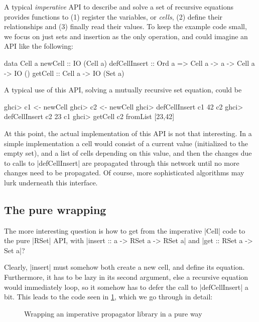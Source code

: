 \documentclass[manuscript,anonymous,screen,acmsmall]{acmart}
\begin{document}
A typical \emph{imperative} API to describe and solve a set of recursive equations provides functions to (1) register the variables, or \emph{cells}, (2) define their relationships and (3) finally read their values. To keep the example code small, we focus on just sets and insertion as the only operation, and could imagine an API like the following:
\begin{code}
data Cell a
newCell       ::  IO (Cell a)
defCellInsert  ::  Ord a => Cell a -> a -> Cell a -> IO ()
getCell       ::  Cell a -> IO (Set a)
\end{code}

A typical use of this API, solving a mutually recursive set equation, could be
\begin{code}
ghci> c1 <- newCell
ghci> c2 <- newCell
ghci> defCellInsert c1 42 c2
ghci> defCellInsert c2 23 c1
ghci> getCell c2
fromList [23,42]
\end{code}

At this point, the actual implementation of this API is not that interesting. In a simple implementation a cell would consist of a current value (initialized to the empty set), and a list of cells depending on this value, and then the changes due to calls to |defCellInsert| are propagated through this network until no more changes need to be propagated. Of course, more sophisticated algorithms may lurk underneath this interface.

\subsection{The pure wrapping}

The more interesting question is how to get from the imperative |Cell| code to the pure |RSet| API, with |insert :: a -> RSet a -> RSet a| and |get :: RSet a -> Set a|?

Clearly, |insert| must somehow both create a new cell, and define its equation.
Furthermore, it has to be lazy in its second argument, else a recursive equation would immediately loop, so it somehow has to defer the call to |defCellInsert| a bit. This leads to the code seen in \cref{fig:wrap}, which we go through in detail:

\begin{figure}%
\setlength{\abovedisplayskip}{0pt}%
\setlength{\belowdisplayskip}{0pt}%
\raggedright%
%
\caption{Wrapping an imperative propagator library in a pure way}\label{fig:wrap}
\end{figure}
\end{document}
